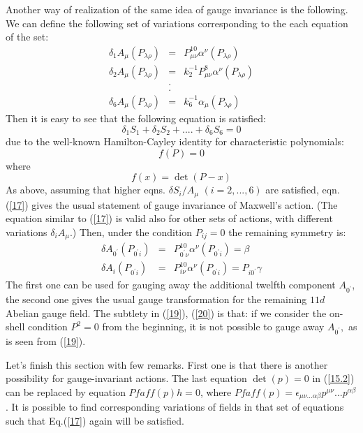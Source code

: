 \documentclass[a4paper,12pt]{article}
\begin{document}
Another way of realization of the same idea of gauge invariance is
the following. We can define the following set of variations
corresponding to the each equation of the set:
\begin{eqnarray}
\delta _{1}A_{\mu }(P_{\lambda \rho }) &=&P_{\mu \nu }^{10}\alpha
^{\nu
}(P_{\lambda \rho })  \nonumber \\
\delta _{2}A_{\mu }(P_{\lambda \rho }) &=&k_{2}^{-1}P_{\mu \nu
}^{8}\alpha
^{\nu }(P_{\lambda \rho })  \label{16} \\
&.&  \nonumber \\
&.&  \nonumber \\
\delta _{6}A_{\mu }(P_{\lambda \rho }) &=&k_{6}^{-1}\alpha _{\mu
}(P_{\lambda \rho })  \nonumber
\end{eqnarray}
Then it is easy to see that the following equation is satisfied:
\begin{equation}
\delta _{1}S_{1}+\delta _{2}S_{2}+....+\delta _{6}S_{6}=0
\label{17}
\end{equation}
due to the well-known Hamilton-Cayley identity for characteristic
polynomials:
\begin{equation}
f(P)=0  \label{18}
\end{equation}
where
\begin{equation}
f(x)=\det (P-x)  \nonumber
\end{equation}
As above, assuming that higher eqns. $\delta S_{i}/A_{\mu }$
$(i=2,...,6)$ are satisfied, eqn. (\ref{17}) gives the usual
statement of gauge invariance of Maxwell's action. (The equation
similar to (\ref{17}) is valid also for other sets of actions,
with different variations $\delta _{i}A_{\mu }$.) Then, under the
condition $P_{ij}=0$ the remaining symmetry is:
\begin{eqnarray}
\delta A_{0^{\prime }}(P_{0^{\prime }i}) &=&P_{0^{\prime }\nu
}^{10}\alpha
^{\nu }(P_{0^{\prime }i})=\beta  \label{19} \\
\delta A_{i}(P_{0^{\prime }i}) &=&P_{i\nu }^{10}\alpha ^{\nu
}(P_{0^{\prime }i})=P_{i0^{\prime }}\gamma  \label{20}
\end{eqnarray}
The first one can be used for gauging away the additional twelfth
component $ A_{0^{\prime }}$, the second one gives the usual gauge
transformation for the remaining $11d$ Abelian gauge field. The
subtlety in (\ref{19}), (\ref{20}) is that: if we consider the
on-shell condition $P^{2}=0$ from the beginning, it is not
possible to gauge away $A_{0^{\prime }},$ as is seen from
(\ref{19}).

Let's finish this section with few remarks. First one is that
there is another possibility for gauge-invariant actions. The last
equation $\det (p) = 0$ in (\ref{15.2}) can be replaced by
equation $Pfaff(p)h = 0$, where
$Pfaff(p)=\epsilon_{\mu\nu...\alpha\beta}p^{\mu\nu}...p^{\alpha\beta}$.
It is possible to find corresponding variations of fields in that
set of equations such that Eq.(\ref{17}) again will be satisfied.
\end{document}
